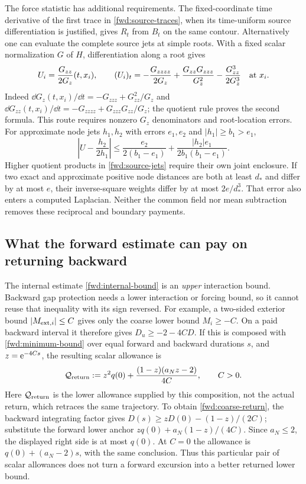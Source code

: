 The force statistic has additional requirements. The fixed-coordinate
time derivative of the first trace in \eqref{fwd:source-traces}, when
its time-uniform source differentiation is justified, gives $R_t$ from
$B_t$ on the same contour. Alternatively one can evaluate the complete
source jets at simple roots. With a fixed scalar normalization $G$ of
$H$, differentiation along a root gives
\begin{equation}
 U_i=\frac{G_{zz}}{2G_z}(t,x_i),\qquad
 (U_i)_t=-\frac{G_{zzzz}}{2G_z}
       +\frac{G_{zz}G_{zzz}}{G_z^2}
       -\frac{G_{zz}^3}{2G_z^3}\quad\hbox{at }x_i.
 \label{fwd:source-jets}
\end{equation}
Indeed $\dd G_z(t,x_i)/\dd t=-G_{zzz}+G_{zz}^2/G_z$ and
$\dd G_{zz}(t,x_i)/\dd t=-G_{zzzz}+G_{zzz}G_{zz}/G_z$;
the quotient rule proves the second formula.
This route requires nonzero $G_z$ denominators and root-location errors.
For approximate node jets $h_1,h_2$ with errors $e_1,e_2$ and
$|h_1|\ge b_1>e_1$,
\begin{equation}
 \left|U-\frac{h_2}{2h_1}\right|
 \le\frac{e_2}{2(b_1-e_1)}
       +\frac{|h_2|e_1}{2b_1(b_1-e_1)}.
 \label{fwd:node-error}
\end{equation}
Higher quotient products in \eqref{fwd:source-jets} require their own
joint enclosure. If two exact and approximate positive node distances
are both at least $d_*$ and differ by at most $e$, their inverse-square
weights differ by at most $2e/d_*^3$. That error also enters a computed
Laplacian. Neither the common field nor mean subtraction removes these
reciprocal and boundary payments.

\subsection{What the forward estimate can pay on returning backward}

The internal estimate \eqref{fwd:internal-bound} is an \emph{upper}
interaction bound. Backward gap protection needs a lower interaction or
forcing bound, so it cannot reuse that inequality with its sign reversed.
For example, a two-sided exterior bound $|M_{{\rm ext},i}|\le C$ gives
only the coarse lower bound $M_i\ge-C$. On a paid backward interval it
therefore gives $D_u\ge-2-4CD$. If this is composed with
\eqref{fwd:minimum-bound} over equal forward and backward durations $s$,
and $z=\mathrm e^{-4Cs}$, the resulting scalar allowance is
\begin{equation}
 \mathcal Q_{\rm return}:=z^2q(0)
       +\frac{(1-z)(a_Nz-2)}{4C},\qquad C>0.
 \label{fwd:coarse-return}
\end{equation}
Here $\mathcal Q_{\rm return}$ is the lower allowance supplied by this
composition, not the actual return, which retraces the same trajectory.
To obtain \eqref{fwd:coarse-return}, the backward integrating factor
gives $D(s)\ge zD(0)-(1-z)/(2C)$; substitute the forward lower
anchor $zq(0)+a_N(1-z)/(4C)$. Since $a_N\le2$, the displayed right
side is at most $q(0)$. At $C=0$ the allowance is
$q(0)+(a_N-2)s$, with the same conclusion. Thus this particular pair
of scalar allowances does not turn a forward excursion into a better
returned lower bound.

